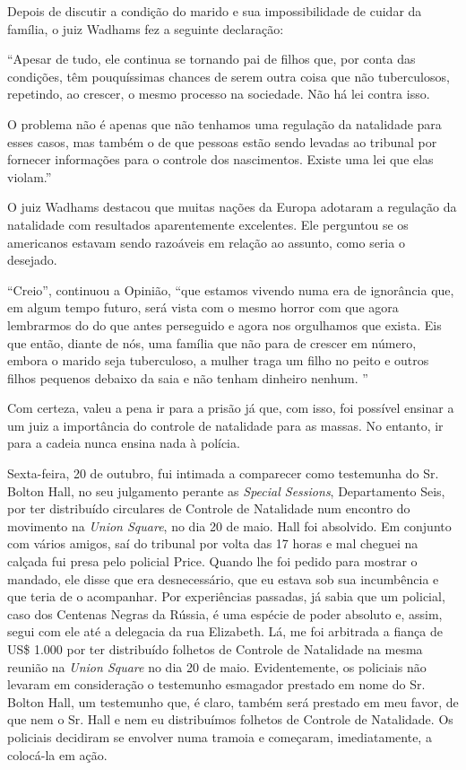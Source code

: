 Depois de discutir a condição do marido e sua impossibilidade de cuidar
da família, o juiz Wadhams fez a seguinte declaração:

``Apesar de tudo, ele continua se tornando pai de filhos que, por conta
das condições, têm pouquíssimas chances de serem outra coisa que não
tuberculosos, repetindo, ao crescer, o mesmo processo na sociedade. Não
há lei contra isso.

O problema não é apenas que não tenhamos uma regulação da natalidade
para esses casos, mas também o de que pessoas estão sendo levadas ao
tribunal por fornecer informações para o controle dos nascimentos.
Existe uma lei que elas violam.''

O juiz Wadhams destacou que muitas nações da Europa adotaram a regulação
da natalidade com resultados aparentemente excelentes. Ele perguntou se
os americanos estavam sendo razoáveis em relação ao assunto, como seria
o desejado.

``Creio'', continuou a Opinião, ``que estamos vivendo numa era de
ignorância que, em algum tempo futuro, será vista com o mesmo horror com
que agora lembrarmos do do que antes perseguido e agora nos orgulhamos
que exista. Eis que então, diante de nós, uma família que não para de
crescer em número, embora o marido seja tuberculoso, a mulher traga um
filho no peito e outros filhos pequenos debaixo da saia e não tenham
dinheiro nenhum. ''

Com certeza, valeu a pena ir para a prisão já que, com isso, foi
possível ensinar a um juiz a importância do controle de natalidade para
as massas. No entanto, ir para a cadeia nunca ensina nada à polícia.

Sexta-feira, 20 de outubro, fui intimada a comparecer como testemunha do
Sr. Bolton Hall, no seu julgamento perante as \emph{Special Sessions},
Departamento Seis, por ter distribuído circulares de Controle de
Natalidade num encontro do movimento na \emph{Union Square}, no dia 20
de maio. Hall foi absolvido. Em conjunto com vários amigos, saí do
tribunal por volta das 17 horas e mal cheguei na calçada fui presa pelo
policial Price. Quando lhe foi pedido para mostrar o mandado, ele disse
que era desnecessário, que eu estava sob sua incumbência e que teria de
o acompanhar. Por experiências passadas, já sabia que um policial, caso
dos Centenas Negras da Rússia, é uma espécie de poder absoluto e, assim,
segui com ele até a delegacia da rua Elizabeth. Lá, me foi arbitrada a
fiança de US\$ 1.000 por ter distribuído folhetos de Controle de
Natalidade na mesma reunião na \emph{Union Square} no dia 20 de maio.
Evidentemente, os policiais não levaram em consideração o testemunho
esmagador prestado em nome do Sr. Bolton Hall, um testemunho que, é
claro, também será prestado em meu favor, de que nem o Sr. Hall e nem eu
distribuímos folhetos de Controle de Natalidade. Os policiais decidiram
se envolver numa tramoia e começaram, imediatamente, a colocá-la em
ação.

